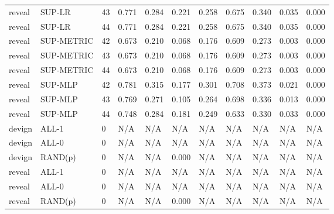 \begin{tabular}{lllllllllll}
reveal & SUP-LR & 43 & 0.771 & 0.284 & 0.221 & 0.258 & 0.675 & 0.340 & 0.035 & 0.000 \\
reveal & SUP-LR & 44 & 0.771 & 0.284 & 0.221 & 0.258 & 0.675 & 0.340 & 0.035 & 0.000 \\
reveal & SUP-METRIC & 42 & 0.673 & 0.210 & 0.068 & 0.176 & 0.609 & 0.273 & 0.003 & 0.000 \\
reveal & SUP-METRIC & 43 & 0.673 & 0.210 & 0.068 & 0.176 & 0.609 & 0.273 & 0.003 & 0.000 \\
reveal & SUP-METRIC & 44 & 0.673 & 0.210 & 0.068 & 0.176 & 0.609 & 0.273 & 0.003 & 0.000 \\
reveal & SUP-MLP & 42 & 0.781 & 0.315 & 0.177 & 0.301 & 0.708 & 0.373 & 0.021 & 0.000 \\
reveal & SUP-MLP & 43 & 0.769 & 0.271 & 0.105 & 0.264 & 0.698 & 0.336 & 0.013 & 0.000 \\
reveal & SUP-MLP & 44 & 0.748 & 0.284 & 0.181 & 0.249 & 0.633 & 0.330 & 0.033 & 0.000 \\
devign & ALL-1 & 0 & N/A & N/A & N/A & N/A & N/A & N/A & N/A & N/A \\
devign & ALL-0 & 0 & N/A & N/A & N/A & N/A & N/A & N/A & N/A & N/A \\
devign & RAND(p) & 0 & N/A & N/A & 0.000 & N/A & N/A & N/A & N/A & N/A \\
reveal & ALL-1 & 0 & N/A & N/A & N/A & N/A & N/A & N/A & N/A & N/A \\
reveal & ALL-0 & 0 & N/A & N/A & N/A & N/A & N/A & N/A & N/A & N/A \\
reveal & RAND(p) & 0 & N/A & N/A & 0.000 & N/A & N/A & N/A & N/A & N/A \\
\bottomrule
\end{tabular}